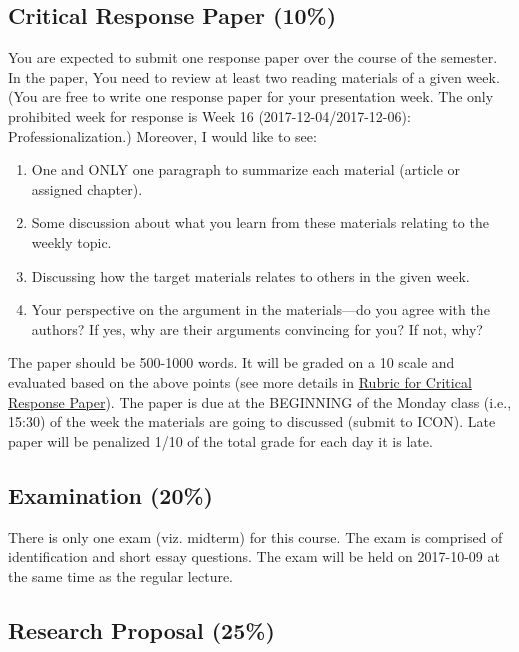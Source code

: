 \documentclass[11pt,]{article}
\providecommand{\tightlist}{%
  \setlength{\itemsep}{0pt}\setlength{\parskip}{0pt}}
\theoremstyle{definition}
\theoremstyle{definition}
\theoremstyle{definition}
\theoremstyle{remark}
\begin{document}
\subsection{Critical Response Paper
(10\%)}\label{critical-response-paper-10}

You are expected to submit one response paper over the course of the
semester. In the paper, You need to review at least two reading
materials of a given week. (You are free to write one response paper for
your presentation week. The only prohibited week for response is Week 16
(2017-12-04/2017-12-06): Professionalization.) Moreover, I would like to
see:

\begin{enumerate}
\def\labelenumi{\arabic{enumi}.}
\tightlist
\item
  One and ONLY one paragraph to summarize each material (article or
  assigned chapter).
\item
  Some discussion about what you learn from these materials relating to
  the weekly topic.
\item
  Discussing how the target materials relates to others in the given
  week.
\item
  Your perspective on the argument in the materials---do you agree with
  the authors? If yes, why are their arguments convincing for you? If
  not, why?
\end{enumerate}

The paper should be 500-1000 words. It will be graded on a 10 scale and
evaluated based on the above points (see more details in
\protect\hyperlink{id}{Rubric for Critical Response Paper}). The paper
is due at the BEGINNING of the Monday class (i.e., 15:30) of the week
the materials are going to discussed (submit to ICON). Late paper will
be penalized 1/10 of the total grade for each day it is late.

\subsection{Examination (20\%)}\label{examination-20}

There is only one exam (viz. midterm) for this course. The exam is
comprised of identification and short essay questions. The exam will be
held on 2017-10-09 at the same time as the regular lecture.

\subsection{Research Proposal (25\%)}\label{research-proposal-25}
\end{document}
